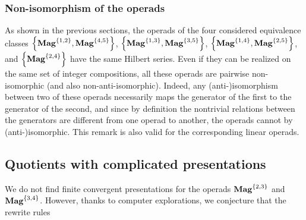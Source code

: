 \subsubsection{Non-isomorphism of the operads}
As shown in the previous sections, the operads of the four considered
equivalence classes $\left\{\mathbf{Mag}^{\{1, 2\}}, \mathbf{Mag}^{\{4, 5\}}\right\}$,
$\left\{\mathbf{Mag}^{\{1, 3\}}, \mathbf{Mag}^{\{3, 5\}}\right\}$,
$\left\{\mathbf{Mag}^{\{1, 4\}}, \mathbf{Mag}^{\{2, 5\}}\right\}$,
and $\left\{\mathbf{Mag}^{\{2, 4\}}\right\}$ have the same Hilbert series. Even
if they can be realized on the same set of integer compositions, all
these operads are pairwise non-isomorphic (and also
non-anti-isomorphic). Indeed, any (anti-)isomorphism between two of
these operads necessarily maps the generator of the first to the
generator of the second, and since by definition the nontrivial
relations between the generators are different from one operad to
another, the operads cannot by (anti-)isomorphic. This remark is also
valid for the corresponding linear operads.
\medbreak

\subsection{Quotients with complicated presentations}
We do not find finite convergent presentations for the operads
$\mathbf{Mag}^{\{2, 3\}}$ and $\mathbf{Mag}^{\{3, 4\}}$. However, thanks to computer
explorations, we conjecture that the rewrite rules

